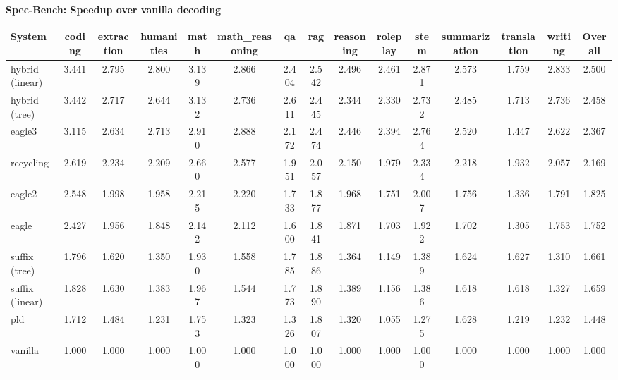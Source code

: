 \textbf{Spec-Bench: Speedup over vanilla decoding}
\begin{table}[H]
\begin{adjustbox}{width=\linewidth}
\centering
\begin{tabular}{lcccccccccccccc}
\toprule
\textbf{System} & coding & extraction & humanities & math & math\_reasoning & qa & rag & reasoning & roleplay & stem & summarization & translation & writing & \textbf{Overall} \\
\midrule
hybrid (linear) & 3.441 & 2.795 & 2.800 & 3.139 & 2.866 & 2.404 & 2.542 & 2.496 & 2.461 & 2.871 & 2.573 & 1.759 & 2.833 & 2.500 \\
hybrid (tree) & 3.442 & 2.717 & 2.644 & 3.132 & 2.736 & 2.611 & 2.445 & 2.344 & 2.330 & 2.732 & 2.485 & 1.713 & 2.736 & 2.458 \\
eagle3 & 3.115 & 2.634 & 2.713 & 2.910 & 2.888 & 2.172 & 2.474 & 2.446 & 2.394 & 2.764 & 2.520 & 1.447 & 2.622 & 2.367 \\
recycling & 2.619 & 2.234 & 2.209 & 2.660 & 2.577 & 1.951 & 2.057 & 2.150 & 1.979 & 2.334 & 2.218 & 1.932 & 2.057 & 2.169 \\
eagle2 & 2.548 & 1.998 & 1.958 & 2.215 & 2.220 & 1.733 & 1.877 & 1.968 & 1.751 & 2.007 & 1.756 & 1.336 & 1.791 & 1.825 \\
eagle & 2.427 & 1.956 & 1.848 & 2.142 & 2.112 & 1.600 & 1.841 & 1.871 & 1.703 & 1.922 & 1.702 & 1.305 & 1.753 & 1.752 \\
suffix (tree) & 1.796 & 1.620 & 1.350 & 1.930 & 1.558 & 1.785 & 1.886 & 1.364 & 1.149 & 1.389 & 1.624 & 1.627 & 1.310 & 1.661 \\
suffix (linear) & 1.828 & 1.630 & 1.383 & 1.967 & 1.544 & 1.773 & 1.890 & 1.389 & 1.156 & 1.386 & 1.618 & 1.618 & 1.327 & 1.659 \\
pld & 1.712 & 1.484 & 1.231 & 1.753 & 1.323 & 1.326 & 1.807 & 1.320 & 1.055 & 1.275 & 1.628 & 1.219 & 1.232 & 1.448 \\
vanilla & 1.000 & 1.000 & 1.000 & 1.000 & 1.000 & 1.000 & 1.000 & 1.000 & 1.000 & 1.000 & 1.000 & 1.000 & 1.000 & 1.000 \\
\bottomrule
\end{tabular}
\end{adjustbox}
\end{table}
